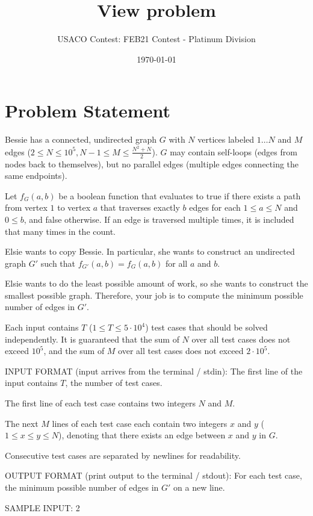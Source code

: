 \documentclass[12pt]{article}
\title{View problem}
\author{USACO Contest: FEB21 Contest - Platinum Division}
\date{\today}
\begin{document}
\maketitle

\section*{Problem Statement}

Bessie has a connected, undirected graph $G$ with $N$ vertices labeled
$1\ldots N$ and $M$ edges ($2\le N\le 10^5, N-1\le M\le \frac{N^2+N}{2}$). $G$
may contain self-loops (edges from nodes back to themselves), but no parallel
edges (multiple edges connecting the same endpoints).

Let $f_G(a,b)$ be a boolean function that evaluates to true if there exists a
path from vertex $1$ to vertex $a$ that traverses exactly $b$ edges for each
$1\le a\le N$ and $0\le b$, and false otherwise. If an edge is traversed
multiple times, it is included that many times in the count.

Elsie wants to copy Bessie. In particular, she wants to construct an undirected
graph $G'$ such that $f_{G'}(a,b)=f_G(a,b)$ for all $a$ and $b$. 

Elsie wants to do the least possible amount of work, so she wants to construct
the smallest possible graph. Therefore, your job is to compute the minimum
possible number of edges in $G'$.

Each input contains $T$ ($1\le T\le 5\cdot 10^4$) test cases that should be
solved independently. It is guaranteed that the sum of $N$ over all test cases
does not exceed $10^5$, and the sum of $M$ over all test cases does not exceed
$2\cdot 10^5$.

INPUT FORMAT (input arrives from the terminal / stdin):
The first line of the input contains $T$, the number of test cases.

The first line of each test case contains two integers $N$ and $M$.

The next $M$ lines of each test case each contain two integers $x$ and $y$
($1\le x\le y\le N$), denoting that there exists an edge between $x$ and $y$ in
$G$.

Consecutive test cases are separated by newlines for readability. 

OUTPUT FORMAT (print output to the terminal / stdout):
For each test case, the minimum possible number of edges in $G'$ on a new line.


SAMPLE INPUT:
2
\end{document}
